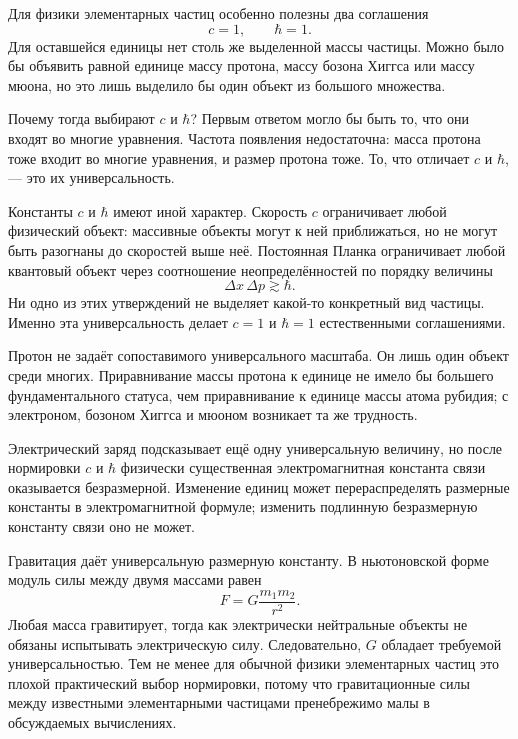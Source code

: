 Для физики элементарных частиц особенно полезны два соглашения
\begin{equation}
c=1,
\qquad
\hbar=1.
\end{equation}
Для оставшейся единицы нет столь же выделенной массы частицы. Можно было бы объявить равной единице массу протона, массу бозона Хиггса или массу мюона, но это лишь выделило бы один объект из большого множества.

Почему тогда выбирают \(c\) и \(\hbar\)? Первым ответом могло бы быть то, что они входят во многие уравнения. Частота появления недостаточна: масса протона тоже входит во многие уравнения, и размер протона тоже. То, что отличает \(c\) и \(\hbar\), — это их универсальность.

Константы \(c\) и \(\hbar\) имеют иной характер. Скорость \(c\) ограничивает любой физический объект: массивные объекты могут к ней приближаться, но не могут быть разогнаны до скоростей выше неё. Постоянная Планка ограничивает любой квантовый объект через соотношение неопределённостей по порядку величины
\begin{equation}
\Delta x\,\Delta p\gtrsim\hbar.
\end{equation}
Ни одно из этих утверждений не выделяет какой-то конкретный вид частицы. Именно эта универсальность делает \(c=1\) и \(\hbar=1\) естественными соглашениями.

Протон не задаёт сопоставимого универсального масштаба. Он лишь один объект среди многих. Приравнивание массы протона к единице не имело бы большего фундаментального статуса, чем приравнивание к единице массы атома рубидия; с электроном, бозоном Хиггса и мюоном возникает та же трудность.

Электрический заряд подсказывает ещё одну универсальную величину, но после нормировки \(c\) и \(\hbar\) физически существенная электромагнитная константа связи оказывается безразмерной. Изменение единиц может перераспределять размерные константы в электромагнитной формуле; изменить подлинную безразмерную константу связи оно не может.

Гравитация даёт универсальную размерную константу. В ньютоновской форме модуль силы между двумя массами равен
\begin{equation}
F=G\frac{m_1m_2}{r^2}.
\end{equation}
Любая масса гравитирует, тогда как электрически нейтральные объекты не обязаны испытывать электрическую силу. Следовательно, \(G\) обладает требуемой универсальностью. Тем не менее для обычной физики элементарных частиц это плохой практический выбор нормировки, потому что гравитационные силы между известными элементарными частицами пренебрежимо малы в обсуждаемых вычислениях.


